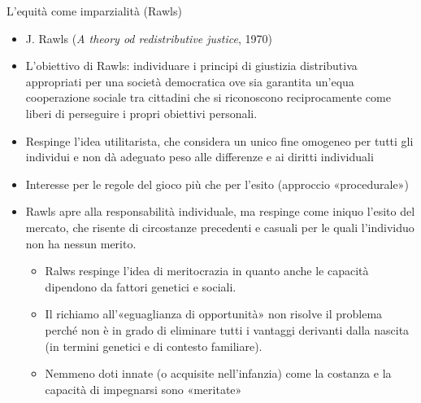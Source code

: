 \documentclass[11pt]{beamer}
\begin{document}
\begin{frame}{L'equità come imparzialità (Rawls)}
\begin{itemize}
\item J. Rawls (\emph{A theory od redistributive justice}, 1970)
\item L'obiettivo di Rawls: individuare i principi di giustizia distributiva
appropriati per una società democratica ove sia garantita un'equa
cooperazione sociale tra cittadini che si riconoscono reciprocamente come
liberi di perseguire i propri obiettivi personali.
\item Respinge l'idea utilitarista, che considera un unico fine omogeneo per tutti
gli individui e non dà adeguato peso alle differenze e ai diritti individuali
\item Interesse per le regole del gioco più che per l'esito (approccio
«procedurale»)
\item Rawls apre alla responsabilità individuale, ma respinge come iniquo l'esito
del mercato, che risente di circostanze precedenti e casuali per le quali
l'individuo non ha nessun merito.
\begin{itemize}
\item Ralws respinge l'idea di \alert{meritocrazia} in quanto anche le capacità
dipendono da fattori genetici e sociali.
\item Il richiamo all'«eguaglianza di opportunità» non risolve il problema
perché non è in grado di eliminare tutti i vantaggi derivanti dalla
nascita (in termini genetici e di contesto familiare).
\item Nemmeno doti innate (o acquisite nell'infanzia) come la costanza e la
capacità di impegnarsi sono «meritate»
\end{itemize}
\end{itemize}
\end{frame}
\end{document}
